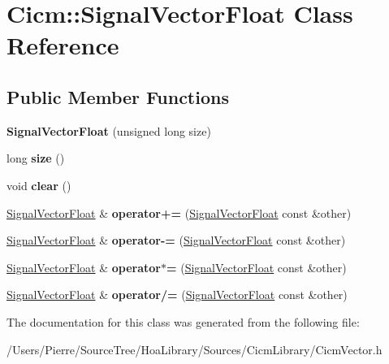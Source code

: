 \hypertarget{class_cicm_1_1_signal_vector_float}{\section{Cicm\-:\-:Signal\-Vector\-Float Class Reference}
\label{class_cicm_1_1_signal_vector_float}
}
\subsection*{Public Member Functions}
\begin{DoxyCompactItemize}
\item 
\hypertarget{class_cicm_1_1_signal_vector_float_aac1588f823d99b115d6211616334bc3e}{{\bfseries Signal\-Vector\-Float} (unsigned long size)}\label{class_cicm_1_1_signal_vector_float_aac1588f823d99b115d6211616334bc3e}

\item 
\hypertarget{class_cicm_1_1_signal_vector_float_a2879b29eb368f23141c50e5264675819}{long {\bfseries size} ()}\label{class_cicm_1_1_signal_vector_float_a2879b29eb368f23141c50e5264675819}

\item 
\hypertarget{class_cicm_1_1_signal_vector_float_a8b14df38db2a55c2138fdd32dd9520db}{void {\bfseries clear} ()}\label{class_cicm_1_1_signal_vector_float_a8b14df38db2a55c2138fdd32dd9520db}

\item 
\hypertarget{class_cicm_1_1_signal_vector_float_a977a446b62196b54ef3c447d6fff1e93}{\hyperlink{class_cicm_1_1_signal_vector_float}{Signal\-Vector\-Float} \& {\bfseries operator+=} (\hyperlink{class_cicm_1_1_signal_vector_float}{Signal\-Vector\-Float} const \&other)}\label{class_cicm_1_1_signal_vector_float_a977a446b62196b54ef3c447d6fff1e93}

\item 
\hypertarget{class_cicm_1_1_signal_vector_float_a6ab54a8133b540b7efe6b874720bdb01}{\hyperlink{class_cicm_1_1_signal_vector_float}{Signal\-Vector\-Float} \& {\bfseries operator-\/=} (\hyperlink{class_cicm_1_1_signal_vector_float}{Signal\-Vector\-Float} const \&other)}\label{class_cicm_1_1_signal_vector_float_a6ab54a8133b540b7efe6b874720bdb01}

\item 
\hypertarget{class_cicm_1_1_signal_vector_float_ac764d8d781bd6c93c4ff81752cc5af76}{\hyperlink{class_cicm_1_1_signal_vector_float}{Signal\-Vector\-Float} \& {\bfseries operator$\ast$=} (\hyperlink{class_cicm_1_1_signal_vector_float}{Signal\-Vector\-Float} const \&other)}\label{class_cicm_1_1_signal_vector_float_ac764d8d781bd6c93c4ff81752cc5af76}

\item 
\hypertarget{class_cicm_1_1_signal_vector_float_a73b26adf418352723db431a4f7658daf}{\hyperlink{class_cicm_1_1_signal_vector_float}{Signal\-Vector\-Float} \& {\bfseries operator/=} (\hyperlink{class_cicm_1_1_signal_vector_float}{Signal\-Vector\-Float} const \&other)}\label{class_cicm_1_1_signal_vector_float_a73b26adf418352723db431a4f7658daf}

\end{DoxyCompactItemize}


The documentation for this class was generated from the following file\-:\begin{DoxyCompactItemize}
\item 
/\-Users/\-Pierre/\-Source\-Tree/\-Hoa\-Library/\-Sources/\-Cicm\-Library/Cicm\-Vector.\-h\end{DoxyCompactItemize}
